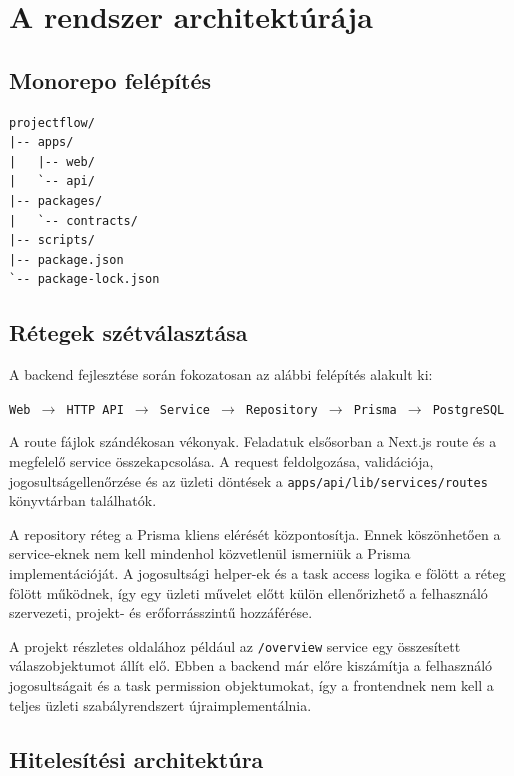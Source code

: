 \documentclass[11pt,a4paper]{report}
\begin{document}
    \chapter{A rendszer architektúrája}

    \section{Monorepo felépítés}

    \begin{lstlisting}
projectflow/
|-- apps/
|   |-- web/
|   `-- api/
|-- packages/
|   `-- contracts/
|-- scripts/
|-- package.json
`-- package-lock.json
    \end{lstlisting}

    \section{Rétegek szétválasztása}

    A backend fejlesztése során fokozatosan az alábbi felépítés alakult ki:

    \begin{center}
        \texttt{Web $\rightarrow$ HTTP API $\rightarrow$ Service $\rightarrow$ Repository
            $\rightarrow$ Prisma $\rightarrow$ PostgreSQL}
    \end{center}

    A route fájlok szándékosan vékonyak. Feladatuk elsősorban a Next.js route és a
    megfelelő service összekapcsolása. A request feldolgozása, validációja,
    jogosultságellenőrzése és az üzleti döntések a
    \texttt{apps/api/lib/services/routes} könyvtárban találhatók.

    A repository réteg a Prisma kliens elérését központosítja. Ennek köszönhetően
    a service-eknek nem kell mindenhol közvetlenül ismerniük a Prisma
    implementációját. A jogosultsági helper-ek és a task access logika e fölött a
    réteg fölött működnek, így egy üzleti művelet előtt külön ellenőrizhető a
    felhasználó szervezeti, projekt- és erőforrásszintű hozzáférése.

    A projekt részletes oldalához például az \texttt{/overview} service egy
    összesített válaszobjektumot állít elő. Ebben a backend már előre kiszámítja a
    felhasználó jogosultságait és a task permission objektumokat, így a frontendnek
    nem kell a teljes üzleti szabályrendszert újraimplementálnia.

    \section{Hitelesítési architektúra}
\end{document}
